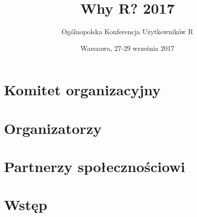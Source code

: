 \documentclass[11pt,twoside,b5paper]{book}
\title{Why R? 2017}
\author{Ogólnopolska Konferencja Użytkowników R}
\date{Warszawa, 27-29 września 2017}
\begin{document}


\clearpage

\frontmatter
\maketitle

\begin{small}
\cleardoublepage
{}
\tableofcontents
\cleardoublepage
{} 
\end{small}

\mainmatter

\chapter*{Komitet organizacyjny}
\par


\chapter*{Organizatorzy}

%
\newpage



\chapter*{Partnerzy społecznościowi}



\newpage


\newpage
















\chapter*{Wstęp}

\end{document}
